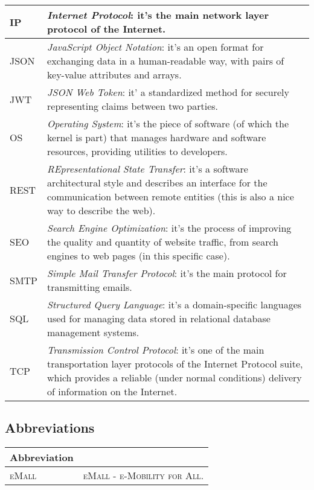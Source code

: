 \begin{center}
\begin{tabular}{ | >{\centering\arraybackslash}m{} | >{\arraybackslash}m{} | }
        \hline
        IP & \textit{Internet Protocol}: it's the main network layer protocol of the Internet. \\
        \hline
        JSON & \textit{JavaScript Object Notation}: it's an open format for exchanging data in a human-readable way, with pairs of key-value attributes and arrays. \\
        \hline
        JWT & \textit{JSON Web Token}: it' a standardized method for securely representing claims between two parties. \\
        \hline
        OS & \textit{Operating System}: it's the piece of software (of which the kernel is part) that manages hardware and software resources, providing utilities to developers. \\
        \hline
        REST & \textit{REpresentational State Transfer}: it's a software architectural style and describes an interface for the communication between remote entities (this is also a nice way to describe the web). \\
        \hline
        SEO & \textit{Search Engine Optimization}: it's the process of improving the quality and quantity of website traffic, from search engines to web pages (in this specific case). \\
        \hline
        SMTP & \textit{Simple Mail Transfer Protocol}: it's the main protocol for transmitting emails. \\
        \hline
        SQL & \textit{Structured Query Language}: it's a domain-specific languages used for managing data stored in relational database management systems. \\
        \hline
        TCP & \textit{Transmission Control Protocol}: it's one of the main transportation layer protocols of the Internet Protocol suite, which provides a reliable (under normal conditions) delivery of information on the Internet. \\
        \hline
    \end{tabular}
\end{center}

\subsection{Abbreviations}

\begin{center}
    \begin{tabular}{ | >{\centering\arraybackslash}m{} | >{\arraybackslash}m{} | }
        \hline
        \textbf{Abbreviation} & \multicolumn{1}{c|}{\textbf{Description}} \\
        \hline
        \hline
        \textsc{eMall} & \textsc{eMall - e-Mobility for All}. \\
        \hline
    \end{tabular}
\end{center}


